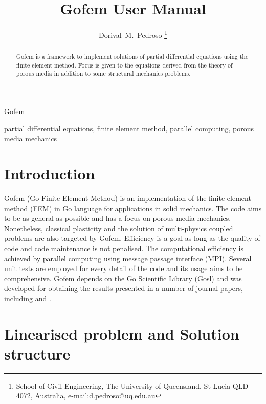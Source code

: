 \documentclass[twoside,journal]{IEEEtran}
\begin{document}
\title{Gofem User Manual}

\author{Dorival~M.~Pedroso%
\thanks{School of Civil Engineering, The University of Queensland, St Lucia QLD 4072, Australia,
e-mail:d.pedroso@uq.edu.au}}

{Gofem}

\maketitle




\begin{abstract}

Gofem is a framework to implement solutions of partial differential equations using the finite
element method. Focus is given to the equations derived from the theory of porous media in addition
to some structural mechanics problems.

\end{abstract}

\begin{IEEEkeywords}
partial differential equations, finite element method, parallel computing, porous media mechanics
\end{IEEEkeywords}



\section{Introduction}
\label{sec:intro}

Gofem (Go Finite Element Method) is an implementation of the finite element method (FEM) in Go
language for applications in solid mechanics. The code aims to be as general as possible and has a
focus on porous media mechanics. Nonetheless, classical plasticity and the solution of multi-physics
coupled problems are also targeted by Gofem. Efficiency is a goal as long as the quality of code and
code maintenance is not penalised. The computational efficiency is achieved by parallel computing
using message passage interface (MPI). Several unit tests are employed for every detail of the code
and its usage aims to be comprehensive. Gofem depends on the Go Scientific Library (Gosl) and was
developed for obtaining the results presented in a number of journal papers, including
\cite{pedroso:15a} and \cite{pedroso:15b}.


\section{Linearised problem and Solution structure}
\end{document}
